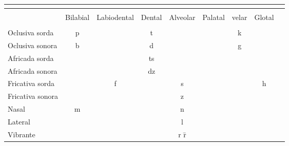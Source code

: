 \documentclass[convert={density=300,size=1080x800,outext=.png}]{standalone}
\begin{document}
{\Large{
	\begin{tabular}{@{}lcccccccc@{}}
	\multicolumn{7}{c}{\phantom{Consonantes}}\\ [1ex]
	\hline\\[-1.5ex]
	& {\sc Bilabial} & {\sc Labiodental} & {\sc Dental} & {\sc Alveolar} & {\sc Palatal} & {\sc velar} & {\sc Glotal} \\[1ex]
	\hline\\[-1.5ex]
	{\sc Oclusiva sorda}   & p         &   & t  &         &              & k & \\ [1ex]
	{\sc Oclusiva sonora}  & b         &   & d  &         &              & g & \\ [1ex]
	{\sc Africada sorda}   &           &   & ts &         & \textteshlig &   & \\ [1ex]
	{\sc Africada sonora}  &           &   & dz &         &              &   & \\ [1ex]
	{\sc Fricativa sorda}  &           & f &    & s       & \textesh     &   & h \\ [1ex]
	{\sc Fricativa sonora} & \textbeta &   &    & z       & \textyogh    &   & \\ [1ex]
	{\sc Nasal}            & m         &   &    & n       & \textltailn  &   & \\ [1ex]
	{\sc Lateral}          &           &   &    & l       & \textturny   &   & \\ [1ex]
	{\sc Vibrante}         &           &   &    & r \={r} &              &   & \\ [1ex]
	\hline
	\end{tabular}
}}
\end{document}
